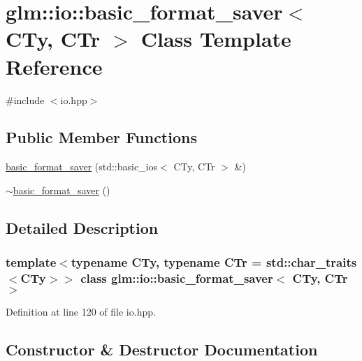 \hypertarget{classglm_1_1io_1_1basic__format__saver}{}\section{glm\+:\+:io\+:\+:basic\+\_\+format\+\_\+saver$<$ C\+Ty, C\+Tr $>$ Class Template Reference}
\label{classglm_1_1io_1_1basic__format__saver}


{\ttfamily \#include $<$io.\+hpp$>$}

\subsection*{Public Member Functions}
\begin{DoxyCompactItemize}
\item 
\hyperlink{classglm_1_1io_1_1basic__format__saver_a9688fa6dce0c32285527df2336ca9127}{basic\+\_\+format\+\_\+saver} (std\+::basic\+\_\+ios$<$ C\+Ty, C\+Tr $>$ \&)
\item 
\hyperlink{classglm_1_1io_1_1basic__format__saver_a49d58d91548a071d5f660c74ca88979b}{$\sim$basic\+\_\+format\+\_\+saver} ()
\end{DoxyCompactItemize}


\subsection{Detailed Description}
\subsubsection*{template$<$typename C\+Ty, typename C\+Tr = std\+::char\+\_\+traits$<$\+C\+Ty$>$$>$\newline
class glm\+::io\+::basic\+\_\+format\+\_\+saver$<$ C\+Ty, C\+Tr $>$}



Definition at line 120 of file io.\+hpp.



\subsection{Constructor \& Destructor Documentation}
\mbox{\label{classglm_1_1io_1_1basic__format__saver_a9688fa6dce0c32285527df2336ca9127}} 
